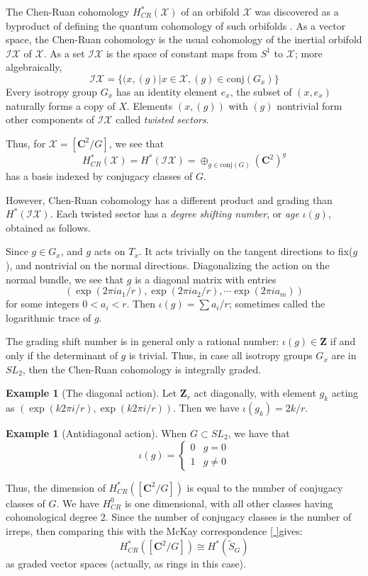 \documentclass{amsart}[12pt]
\theoremstyle{definition}
\newtheorem{example}[dummy]{Example}
\newcommand{\Z}{\mathbf{Z}}
\newcommand{\C}{\mathbf{C}}
\begin{document}
The Chen-Ruan cohomology $H_{CR}^*(\mathcal{X})$ of an orbifold $\mathcal{X}$ was discovered as a byproduct of defining the quantum cohomology of such orbifolds \cite{chenruancohomology}.  As a vector space, the Chen-Ruan cohomology is the usual cohomology of the inertial orbifold $\mathcal{IX}$ of $\mathcal{X}$.  As a set $\mathcal{IX}$ is the space of constant maps from $S^1$ to $\mathcal{X}$; more algebraically, 
$$\mathcal{IX}=\{(x, (g)| x\in \mathcal{X}, (g)\in\textrm{conj}(G_x)\}$$
Every isotropy group $G_x$ has an identity element $e_x$, the subset of $(x, e_x)$ naturally forms a copy of $X$.  Elements $(x,(g))$ with $(g)$ nontrivial form other components of $\mathcal{IX}$ called \emph{twisted sectors}.

Thus, for $\mathcal{X}=[\C^2/G]$, we see that 
$$H_{CR}^*(\mathcal{X}) =H^*(\mathcal{IX})=\oplus_{g\in\textrm{conj}(G)} (\C^2)^g$$
has a basis indexed by conjugacy classes of $G$.

However, Chen-Ruan cohomology has a different product and grading than $H^*(\mathcal{IX})$.  Each twisted sector has a \emph{degree shifting number}, or \emph{age} $\iota(g)$, obtained as follows.

Since $g\in G_x$, and $g$ acts on $T_x$.  It acts trivially on the tangent directions to fix($g$), and nontrivial on the normal directions.  Diagonalizing the action on the normal bundle, we see that $g$ is a diagonal matrix with entries 
$$(\exp(2\pi i a_1/r), \exp(2\pi i a_2/r), \cdots \exp(2\pi i a_m))$$
for some integers $0<a_i<r$.
Then $\iota(g)=\sum a_i/r$; sometimes called the logarithmic trace of $g$.



The grading shift number is in general only a rational number: $\iota(g)\in \Z$ if and only if the determinant of $g$ is trivial.  Thus, in case all isotropy groups $G_x$ are in $SL_2$, then the Chen-Ruan cohomology is integrally graded.

\begin{example}[The diagonal action]
Let $\Z_r$ act diagonally, with element $g_k$ acting as $(\exp(k2\pi i/r),\exp(k2\pi i/r))$.  Then we have $\iota(g_k)=2k/r$.
\end{example}


\begin{example}[Antidiagonal action]
When $G\subset SL_2$, we have that 
$$\iota(g)=\left\{\begin{array}{rl} 0 & g=0 \\
1 & g\neq 0 \end{array}\right.
$$

Thus, the dimension of $H_{CR}^*([\C^2/G])$ is equal to the number of conjugacy classes of $G$.  We have $H_{CR}^0$ is one dimensional, with all other classes having cohomological degree 2.  Since the number of conjugacy classes is the number of irreps, then comparing this with the McKay correspondence \ref{ }gives:
$$H_{CR}^*([\C^2/G])\cong H^*(\widetilde{S}_G)$$
as graded vector spaces (actually, as rings in this case).  
\end{example}
\end{document}
